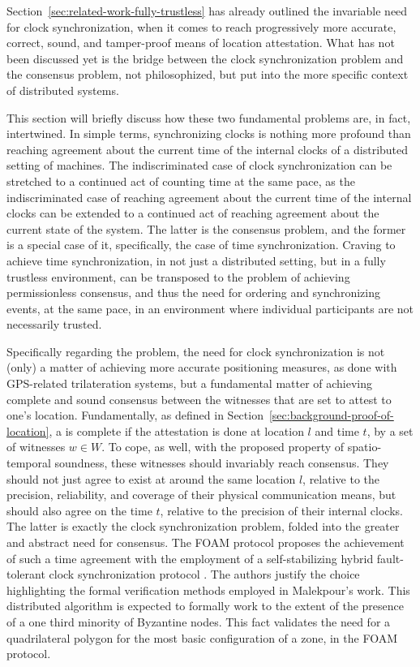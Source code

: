 Section~\ref{sec:related-work-fully-trustless} has already outlined the invariable need for clock synchronization, when it comes to reach progressively more accurate, correct, sound, and tamper-proof means of location attestation. What has not been discussed yet is the bridge between the clock synchronization problem and the consensus problem, not philosophized, but put into the more specific context of distributed systems. 

This section will briefly discuss how these two fundamental problems are, in fact, intertwined. In simple terms, synchronizing clocks is nothing more profound than reaching agreement about the current time of the internal clocks of a distributed setting of machines. The indiscriminated case of clock synchronization can be stretched to a continued act of counting time at the same pace, as the indiscriminated case of reaching agreement about the current time of the internal clocks can be extended to a continued act of reaching agreement about the current state of the system. The latter is the consensus problem, and the former is a special case of it, specifically, the case of time synchronization. Craving to achieve time synchronization, in not just a distributed setting, but in a fully trustless environment, can be transposed to the problem of achieving permissionless consensus, and thus the need for ordering and synchronizing events, at the same pace, in an environment where individual participants are not necessarily trusted.

Specifically regarding the \pol{} problem, the need for clock synchronization is not (only) a matter of achieving more accurate positioning measures, as done with GPS-related trilateration systems, but a fundamental matter of achieving complete and sound consensus between the witnesses that are set to attest to one's location. Fundamentally, as defined in Section~\ref{sec:background-proof-of-location}, a \pol{} is complete if the attestation is done at location $l$ and time $t$, by a set of witnesses $w \in W$. To cope, as well, with the proposed property of spatio-temporal soundness, these witnesses should invariably reach consensus. They should not just agree to exist at around the same location $l$, relative to the precision, reliability, and coverage of their physical communication means, but should also agree on the time $t$, relative to the precision of their internal clocks. The latter is exactly the clock synchronization problem, folded into the greater and abstract need for consensus. The FOAM protocol proposes the achievement of such a time agreement with the employment of a self-stabilizing hybrid fault-tolerant clock synchronization protocol \cite{foam-white-paper, malekpour2015self}. The authors justify the choice highlighting the formal verification methods employed in Malekpour's work. This distributed algorithm is expected to formally work to the extent of the presence of a one third minority of Byzantine nodes. This fact validates the need for a quadrilateral polygon for the most basic configuration of a zone, in the FOAM protocol. 

